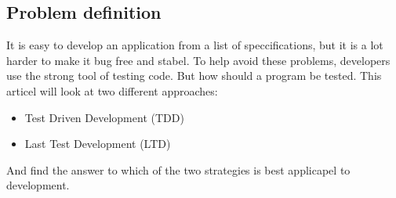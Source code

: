 \subsection{Problem definition}
\label{section:problem}
It is easy to develop an application from a list of speccifications, but it is a lot harder to make it bug free and stabel. To help avoid these problems, developers use the strong tool of testing code. But how should a program be tested. This articel will look at two different approaches:
\begin{itemize}
\item Test Driven Development (TDD)
\item Last Test Development (LTD) 
\end{itemize}
And find the answer to which of the two strategies is best applicapel to development.









